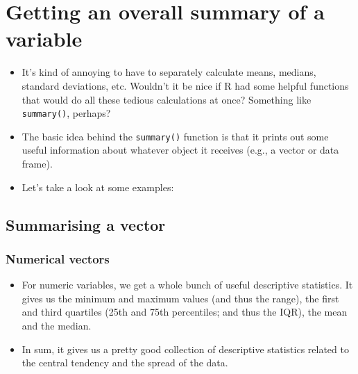 \documentclass[
]{book}
\newenvironment{Shaded}{\begin{snugshade}}{\end{snugshade}}
\newcommand{\FunctionTok}[1]{\textcolor[rgb]{0.13,0.29,0.53}{\textbf{#1}}}
\newcommand{\NormalTok}[1]{#1}
\newcommand{\SpecialCharTok}[1]{\textcolor[rgb]{0.81,0.36,0.00}{\textbf{#1}}}
\providecommand{\tightlist}{%
  \setlength{\itemsep}{0pt}\setlength{\parskip}{0pt}}
\begin{document}
\hypertarget{summary}{%
\section{Getting an overall summary of a variable}\label{summary}}

\begin{itemize}
\tightlist
\item
  It's kind of annoying to have to separately calculate means, medians, standard deviations, etc. Wouldn't it be nice if R had some helpful functions that would do all these tedious calculations at once? Something like \texttt{summary()}, perhaps?
\item
  The basic idea behind the \texttt{summary()} function is that it prints out some useful information about whatever object it receives (e.g., a vector or data frame).
\item
  Let's take a look at some examples:
\end{itemize}

\hypertarget{summarising-a-vector}{%
\subsection{Summarising a vector}\label{summarising-a-vector}}

\hypertarget{numerical-vectors}{%
\subsubsection{Numerical vectors}\label{numerical-vectors}}

\begin{itemize}
\tightlist
\item
  For numeric variables, we get a whole bunch of useful descriptive statistics. It gives us the minimum and maximum values (and thus the range), the first and third quartiles (25th and 75th percentiles; and thus the IQR), the mean and the median.
\item
  In sum, it gives us a pretty good collection of descriptive statistics related to the central tendency and the spread of the data.
\end{itemize}

\begin{Shaded}
\end{Shaded}
\end{document}
